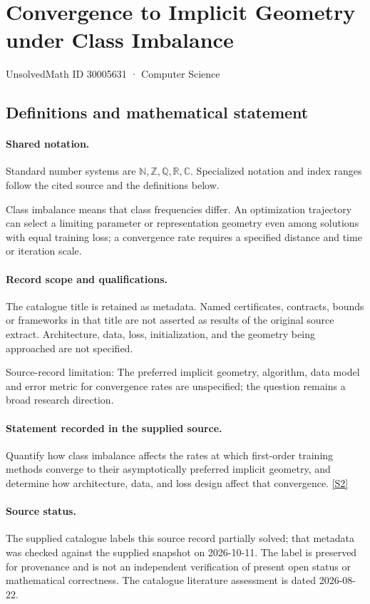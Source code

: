 \documentclass[11pt]{article}
\newcommand{\sref}[2]{\hyperlink{source:#1:#2}{[S#2]}}
\begin{document}
\setcounter{section}{30005630}
\section{Convergence to Implicit Geometry under Class Imbalance}\label{30005631}
{\small\sffamily UnsolvedMath ID 30005631 · Computer Science}
\subsection{Definitions and mathematical statement}

\paragraph{Shared notation.}Standard number systems are $\mathbb N,\mathbb Z,\mathbb Q,\mathbb R,\mathbb C$. Specialized notation and index ranges follow the cited source and the definitions below.


Class imbalance means that class frequencies differ. An optimization trajectory can select a limiting parameter or representation geometry even among solutions with equal training loss; a convergence rate requires a specified distance and time or iteration scale.
\paragraph{Record scope and qualifications.}
The catalogue title is retained as metadata. Named certificates, contracts, bounds or frameworks in that title are not asserted as results of the original source extract.
Architecture, data, loss, initialization, and the geometry being approached are not specified.

Source-record limitation: The preferred implicit geometry, algorithm, data model and error metric for convergence rates are unspecified; the question remains a broad research direction.
\paragraph{Statement recorded in the supplied source.}
Quantify how class imbalance affects the rates at which first-order training methods converge to their asymptotically preferred implicit geometry, and determine how architecture, data, and loss design affect that convergence. \sref{30005631}{2}
\paragraph{Source status.}
The supplied catalogue labels this source record partially solved; that metadata was checked against the supplied snapshot on 2026-10-11. The label is preserved for provenance and is not an independent verification of present open status or mathematical correctness. The catalogue literature assessment is dated 2026-08-22.
\end{document}
